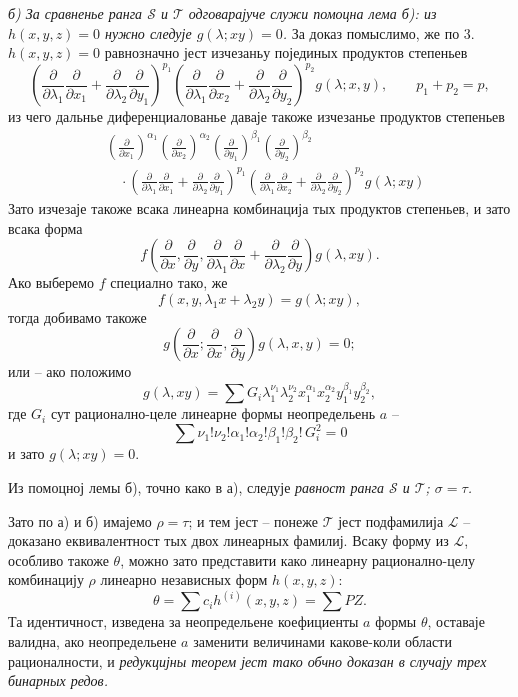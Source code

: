 \documentclass[11pt]{article}
\begin{document}
{\itshape б) За сравненье ранга $\mathcal S$ и $\mathcal T$ одговарајуче служи помоцна лема б): из $h(x,y,z)=0$ нужно следује $g(\lambda;xy)=0$.} За доказ помыслимо, же по 3. $h(x,y,z)=0$ равнозначно јест изчезаньу појединых продуктов степеньев
\[
 \left(\frac{\partial}{\partial\lambda_1}\frac{\partial}{\partial x_1}
 +\frac{\partial}{\partial\lambda_2}\frac{\partial}{\partial y_1}\right)^{p_1}
 \left(\frac{\partial}{\partial\lambda_1}\frac{\partial}{\partial x_2}
 +\frac{\partial}{\partial\lambda_2}\frac{\partial}{\partial y_2}\right)^{p_2}g(\lambda;x,y),
 \qquad p_1+p_2=p,
\]
из чего дальнье диференциалованье даваје такоже изчезанье продуктов степеньев
\[
\begin{aligned}
&\left(\frac{\partial}{\partial x_1}\right)^{\alpha_1}
 \left(\frac{\partial}{\partial x_2}\right)^{\alpha_2}
 \left(\frac{\partial}{\partial y_1}\right)^{\beta_1}
 \left(\frac{\partial}{\partial y_2}\right)^{\beta_2} \\
&\quad\cdot
 \left(\frac{\partial}{\partial\lambda_1}\frac{\partial}{\partial x_1}
 +\frac{\partial}{\partial\lambda_2}\frac{\partial}{\partial y_1}\right)^{p_1}
 \left(\frac{\partial}{\partial\lambda_1}\frac{\partial}{\partial x_2}
 +\frac{\partial}{\partial\lambda_2}\frac{\partial}{\partial y_2}\right)^{p_2}
 g(\lambda;xy)
\end{aligned}
\]
Зато изчезаје такоже всака линеарна комбинација тых продуктов степеньев, и зато всака форма
\[
  f\left(\frac{\partial}{\partial x},\frac{\partial}{\partial y},
  \frac{\partial}{\partial\lambda_1}\frac{\partial}{\partial x}
  +\frac{\partial}{\partial\lambda_2}\frac{\partial}{\partial y}\right)g(\lambda,xy).
\]
Ако выберемо $f$ специално тако, же
\[
  f(x,y,\lambda_1x+\lambda_2y)=g(\lambda;xy),
\]
тогда добивамо такоже
\[
  g\left(\frac{\partial}{\partial x};
    \frac{\partial}{\partial x},
    \frac{\partial}{\partial y}\right)g(\lambda,x,y)=0;
\]
или -- ако положимо
\[
  g(\lambda,xy)=\sum G_i\lambda_1^{\nu_1}\lambda_2^{\nu_2}
  x_1^{\alpha_1}x_2^{\alpha_2}y_1^{\beta_1}y_2^{\beta_2},
\]
где $G_i$ сут рационално-целе линеарне формы неопредельень $a$ -- 
\[
  \sum \nu_1!\nu_2!\alpha_1!\alpha_2!\beta_1!\beta_2!\,G_i^2=0
\]
и зато $g(\lambda;xy)=0$.

Из помоцној лемы б), точно како в а), следује {\itshape равност ранга $\mathcal S$ и $\mathcal T$; $\sigma=\tau$.}

Зато по а) и б) имајемо $\rho=\tau$; и тем јест -- понеже $\mathcal T$ јест подфамилија $\mathcal L$ -- доказано еквивалентност тых двох линеарных фамилиј. Всаку форму из $\mathcal L$, особливо такоже $\theta$, можно зато представити како линеарну рационално-целу комбинацију $\rho$ линеарно независных форм $h(x,y,z)$:
\[
  \theta=\sum c_i h^{(i)}(x,y,z)=\sum PZ.
\]
Та идентичност, изведена за неопредельене коефициенты $a$ формы $\theta$, оставаје валидна, ако неопредельене $a$ заменити величинами какове-коли области рационалности, и {\itshape редукцијны теорем јест тако обчно доказан в случају трех бинарных редов.}
\end{document}

